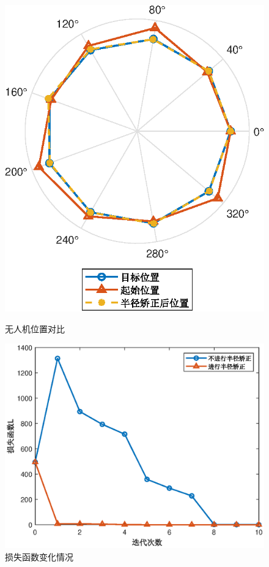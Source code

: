 \documentclass[12pt,AutoFakeSlant,AutoFakeBold]{article}
\begin{document}
\begin{figure}[!ht]
    \centering
    \begin{minipage}[t]{0.34\textwidth}
        \centering
        \includegraphics[width=\textwidth]{图片/无人机位置对比.eps}
        \caption{无人机位置对比}
        \label{fig:无人机位置对比}
    \end{minipage}
    \begin{minipage}[t]{0.58\textwidth}
        \centering
        \includegraphics[width=\textwidth]{图片/损失函数变化.eps}
        \caption{损失函数变化情况}
        \label{fig:损失函数变化}
    \end{minipage}
\end{figure}
\end{document}
